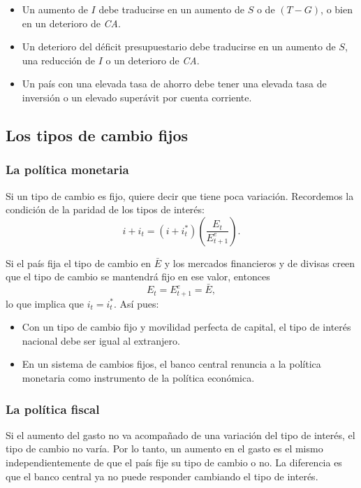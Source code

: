 \documentclass[10pt]{article}
\begin{document}
\begin{multicols*}{2}
\begin{itemize}
    \item Un aumento de $I$ debe traducirse en un aumento de $S$ o de $(T-G)$, o bien en un deterioro de \textit{CA}.
    \item Un deterioro del déficit presupuestario debe traducirse en un aumento de $S$, una reducción de $I$ o un deterioro de \textit{CA}.
    \item Un país con una elevada tasa de ahorro debe tener una elevada tasa de inversión o un elevado superávit por cuenta corriente.
\end{itemize}

\subsection{Los tipos de cambio fijos}

\subsubsection{La política monetaria}
Si un tipo de cambio es fijo, quiere decir que tiene poca variación. Recordemos la condición de la paridad de los tipos de interés:
\[ i + i_t = (i+i_t^*)\left(\frac{E_t}{E^e_{t+1}} \right). \]

Si el país fija el tipo de cambio en $\bar{E}$ y los mercados financieros y de divisas creen que el tipo de cambio se mantendrá fijo en ese valor, entonces 
\[ E_t = E^e_{t+1} = \bar{E}, \]
lo que implica que $i_t = i_t^*$. Así pues:
\begin{itemize}
    \item Con un tipo de cambio fijo y movilidad perfecta de capital, el tipo de interés nacional debe ser igual al extranjero.
    \item En un sistema de cambios fijos, el banco central renuncia a la política monetaria como instrumento de la política económica.
\end{itemize}

\subsubsection{La política fiscal}
Si el aumento del gasto no va acompañado de una variación del tipo de interés, el tipo de cambio no varía. Por lo tanto, un aumento en el gasto es el mismo independientemente de que el país fije su tipo de cambio o no. La diferencia es que el banco central ya no puede responder cambiando el tipo de interés.


\end{multicols*}
\end{document}
